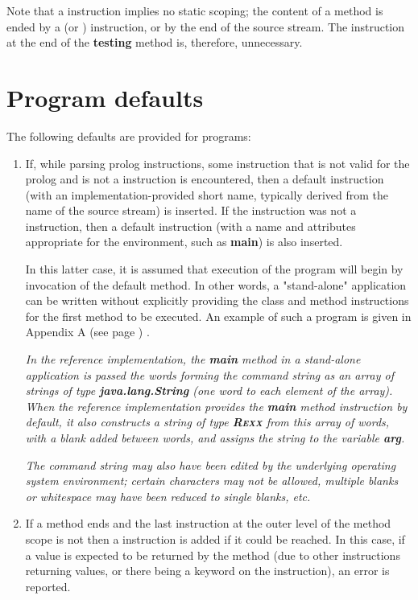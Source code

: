 Note that a  instruction implies no static scoping; the
content of a method is ended by a  (or )
instruction, or by the end of the source stream.
The  instruction at the end of the \textbf{testing}
method is, therefore, unnecessary.
\section{Program defaults}\label{programdefaults}
 
The following defaults are provided for \nr{} programs:
\begin{enumerate}
\item If, while parsing prolog instructions, some instruction that is not
valid for the prolog and is not a  instruction is
encountered, then a default  instruction (with an
implementation-provided short name, typically derived from the name of
the source stream) is inserted.  If the instruction was not a
 instruction, then a default  instruction
(with a name and attributes appropriate for the environment, such
as \textbf{main}) is also inserted.
 
In this latter case, it is assumed that execution of the program will
begin by invocation of the default method.
In other words, a "stand-alone" application can be written without
explicitly providing the class and method instructions for the first
method to be executed.
An example of such a program is given in  Appendix A (see page \pageref{refappa}) .

 
\emph{In the reference implementation, the \textbf{main} method in a
stand-alone application is passed the words forming the command string
as an array of strings of type \textbf{java.lang.String} (one word to
each element of the array).
When the \nr{} reference implementation provides the \textbf{main}
method instruction by default, it also constructs a \nr{} string of
type \textbf{R\textsc{exx}} from this array of words, with a blank added
between words, and assigns the string to the variable
\textbf{arg}.}
 
\emph{The command string may also have been edited by the underlying
operating system environment; certain characters may not be
allowed, multiple blanks or whitespace may have been reduced to
single blanks, etc.
}

\item If a method ends and the last instruction at the outer level of the
method scope is not  then a  instruction
is added if it could be reached.
In this case, if a value is expected to be returned by the method (due
to other  instructions returning values, or there being a
 keyword on the  instruction), an error
is reported.


\end{enumerate}

